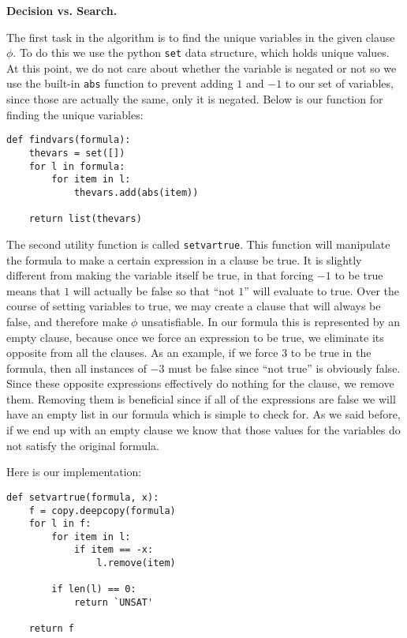\documentclass[11pt, letterpaper]{article}
\newcommand{\solution}[1]{\noindent{\textbf{Solution #1:}}}
\newcommand{\myskip}{\vskip 0.5in}
\begin{document}
\myskip

\solution{3} \textbf{Decision vs. Search.}

The first task in the algorithm is to find the unique variables in the given
clause $\phi$. To do this we use the python \texttt{set} data structure, which
holds unique values. At this point, we do not care about whether the variable
is negated or not so we use the built-in \texttt{abs} function to prevent adding
$1$ and $-1$ to our set of variables, since those are actually the same, only
it is negated. Below is our function for finding the unique variables:

\begin{verbatim}
def findvars(formula):
    thevars = set([])
    for l in formula:
        for item in l:
            thevars.add(abs(item))

    return list(thevars)
\end{verbatim}

The second utility function is called \texttt{setvartrue}. This function will
manipulate the formula to make a certain expression in a clause be true. It is
slightly different from making the variable itself be true, in that forcing $-1$
to be true means that $1$ will actually be false so that ``not $1$'' will
evaluate to true. Over the course of setting variables to true, we may create a
clause that will always be false, and therefore make $\phi$ unsatisfiable. In
our formula this is represented by an empty clause, because once we force an
expression to be true, we eliminate its opposite from all the clauses. As an
example, if we force $3$ to be true in the formula, then all instances of $-3$
must be false since ``not true'' is obviously false. Since these opposite
expressions effectively do nothing for the clause, we remove them. Removing them
is beneficial since if all of the expressions are false we will have an empty
list in our formula which is simple to check for. As we said before, if we end
up with an empty clause we know that those values for the variables do not
satisfy the original formula.

Here is our implementation:

\begin{verbatim} 
def setvartrue(formula, x):
    f = copy.deepcopy(formula)
    for l in f:
        for item in l:
            if item == -x:
                l.remove(item)

        if len(l) == 0:
            return `UNSAT'

    return f
\end{verbatim}
\end{document}
